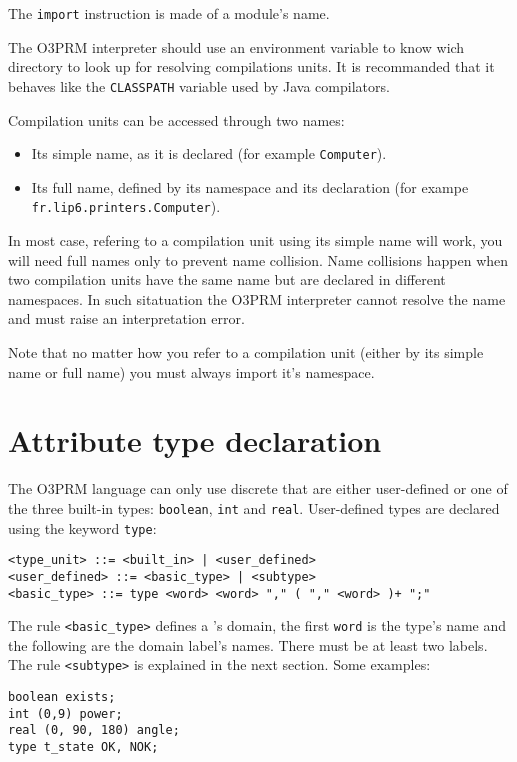 \documentclass[singlespacing,12pt,a4paper]{article}
\begin{document}
The \verb+import+ instruction is made of a module's name.

The O3PRM interpreter should use an environment variable to know wich directory
to look up for resolving compilations units. It is recommanded that it behaves
like the \verb+CLASSPATH+ variable used by Java compilators.

Compilation units can be accessed through two names:
\begin{itemize}
\item Its simple name, as it is declared (for example \verb+Computer+).
\item Its full name, defined by its namespace and its declaration (for exampe
\verb+fr.lip6.printers.Computer+).
\end{itemize}
In most case, refering to a compilation unit using its simple name will work,
you will need full names only to prevent name collision. Name collisions happen
when two compilation units have the same name but are declared in different
namespaces. In such sitatuation the O3PRM interpreter cannot resolve the name
and must raise an interpretation error.

Note that no matter how you refer to a compilation unit (either by its simple
name or full name) you must always import it's namespace.

\section{Attribute type declaration}

The O3PRM language can only use discrete \rvs{} that are either user-defined or
one of the three built-in types: \verb+boolean+, \verb+int+ and \verb+real+.
User-defined types are declared using the keyword \verb+type+:

\begin{footnotesize}
\begin{verbatim}
<type_unit> ::= <built_in> | <user_defined>
<user_defined> ::= <basic_type> | <subtype>
<basic_type> ::= type <word> <word> "," ( "," <word> )+ ";"
\end{verbatim}
\end{footnotesize}

The rule \verb+<basic_type>+ defines a \rv{}'s domain, the first \verb+word+
is the type's name and the following are the domain label's names. There must
be at least two labels. The rule \verb+<subtype>+ is explained in the
next section. Some examples:

\begin{footnotesize}
\begin{verbatim}
boolean exists;
int (0,9) power;
real (0, 90, 180) angle;
type t_state OK, NOK;
\end{verbatim}
\end{footnotesize}
\end{document}
